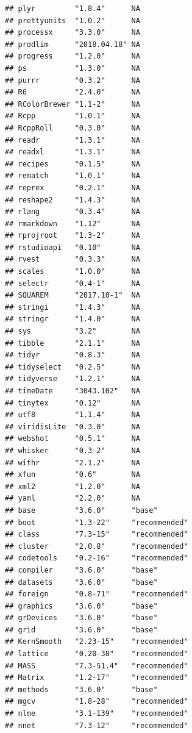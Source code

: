 \documentclass[]{article}
\begin{document}
\begin{verbatim}
## plyr         "1.8.4"      NA           
## prettyunits  "1.0.2"      NA           
## processx     "3.3.0"      NA           
## prodlim      "2018.04.18" NA           
## progress     "1.2.0"      NA           
## ps           "1.3.0"      NA           
## purrr        "0.3.2"      NA           
## R6           "2.4.0"      NA           
## RColorBrewer "1.1-2"      NA           
## Rcpp         "1.0.1"      NA           
## RcppRoll     "0.3.0"      NA           
## readr        "1.3.1"      NA           
## readxl       "1.3.1"      NA           
## recipes      "0.1.5"      NA           
## rematch      "1.0.1"      NA           
## reprex       "0.2.1"      NA           
## reshape2     "1.4.3"      NA           
## rlang        "0.3.4"      NA           
## rmarkdown    "1.12"       NA           
## rprojroot    "1.3-2"      NA           
## rstudioapi   "0.10"       NA           
## rvest        "0.3.3"      NA           
## scales       "1.0.0"      NA           
## selectr      "0.4-1"      NA           
## SQUAREM      "2017.10-1"  NA           
## stringi      "1.4.3"      NA           
## stringr      "1.4.0"      NA           
## sys          "3.2"        NA           
## tibble       "2.1.1"      NA           
## tidyr        "0.8.3"      NA           
## tidyselect   "0.2.5"      NA           
## tidyverse    "1.2.1"      NA           
## timeDate     "3043.102"   NA           
## tinytex      "0.12"       NA           
## utf8         "1.1.4"      NA           
## viridisLite  "0.3.0"      NA           
## webshot      "0.5.1"      NA           
## whisker      "0.3-2"      NA           
## withr        "2.1.2"      NA           
## xfun         "0.6"        NA           
## xml2         "1.2.0"      NA           
## yaml         "2.2.0"      NA           
## base         "3.6.0"      "base"       
## boot         "1.3-22"     "recommended"
## class        "7.3-15"     "recommended"
## cluster      "2.0.8"      "recommended"
## codetools    "0.2-16"     "recommended"
## compiler     "3.6.0"      "base"       
## datasets     "3.6.0"      "base"       
## foreign      "0.8-71"     "recommended"
## graphics     "3.6.0"      "base"       
## grDevices    "3.6.0"      "base"       
## grid         "3.6.0"      "base"       
## KernSmooth   "2.23-15"    "recommended"
## lattice      "0.20-38"    "recommended"
## MASS         "7.3-51.4"   "recommended"
## Matrix       "1.2-17"     "recommended"
## methods      "3.6.0"      "base"       
## mgcv         "1.8-28"     "recommended"
## nlme         "3.1-139"    "recommended"
## nnet         "7.3-12"     "recommended"

\end{verbatim}
\end{document}
